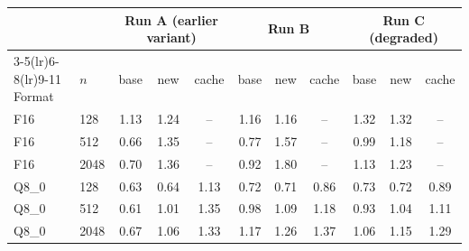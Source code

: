 \begin{tabular}{llccccccccc}
\toprule
& & \multicolumn{3}{c}{Run A (earlier variant)} & \multicolumn{3}{c}{Run B} & \multicolumn{3}{c}{Run C (degraded)}\\
\cmidrule(lr){3-5}\cmidrule(lr){6-8}\cmidrule(lr){9-11}
Format & $n$ & base & new & cache & base & new & cache & base & new & cache\\
\midrule
F16  & 128  & 1.13 & 1.24 & --   & 1.16 & 1.16 & --   & 1.32 & 1.32 & --\\
F16  & 512  & 0.66 & 1.35 & --   & 0.77 & 1.57 & --   & 0.99 & 1.18 & --\\
F16  & 2048 & 0.70 & 1.36 & --   & 0.92 & 1.80 & --   & 1.13 & 1.23 & --\\
\addlinespace
Q8\_0 & 128  & 0.63 & 0.64 & 1.13 & 0.72 & 0.71 & 0.86 & 0.73 & 0.72 & 0.89\\
Q8\_0 & 512  & 0.61 & 1.01 & 1.35 & 0.98 & 1.09 & 1.18 & 0.93 & 1.04 & 1.11\\
Q8\_0 & 2048 & 0.67 & 1.06 & 1.33 & 1.17 & 1.26 & 1.37 & 1.06 & 1.15 & 1.29\\
\bottomrule
\end{tabular}
